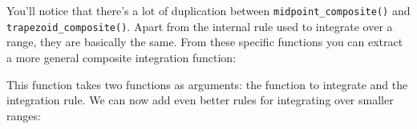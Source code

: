 You'll notice that there's a lot of duplication between
\texttt{midpoint\_composite()} and \texttt{trapezoid\_composite()}.
Apart from the internal rule used to integrate over a range, they are
basically the same. From these specific functions you can extract a more
general composite integration function:

\begin{Shaded}
\begin{Highlighting}[]
\StringTok{ } 
  \StringTok{ } \StringTok{ }\NormalTok{)}

  \StringTok{ }
    \StringTok{ }\StringTok{ }\NormalTok{(f, points[i], points[i +}\StringTok{ }\NormalTok{])}
  \NormalTok{\}}

\NormalTok{\}}

 \NormalTok{, } 
 \NormalTok{, } 
\end{Highlighting}
\end{Shaded}

This function takes two functions as arguments: the function to
integrate and the integration rule. We can now add even better rules for
integrating over smaller ranges:

